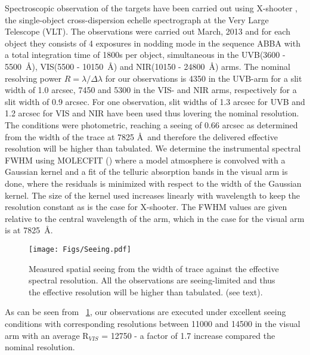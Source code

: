 \documentclass{aa}    %
\newcommand{\figref}[1]{\ref{fig:#1}}
\newcommand{\Fig}[1]{\figurename~\figref{#1}}
\newcommand{\fig}[1]{\Fig{#1}}
\newcommand{\figlabel}[1]{\label{fig:#1}}
\begin{document}
Spectroscopic observation of the targets have been carried out using X-shooter \citep{Vernet2011}, the single-object cross-dispersion echelle spectrograph at the Very Large Telescope (VLT). The observations were carried out March, 2013 and for each object they consists of 4 exposures in nodding mode in the sequence ABBA with a total integration time of 1800s per object, simultaneous in the UVB(3600 - 5500~\AA), VIS(5500 - 10150~\AA)  and NIR(10150 - 24800~\AA) arms. The nominal resolving power $R = \lambda / \Delta \lambda$ for our observations is 4350 in the UVB-arm for a slit width of 1.0 arcsec, 7450 and 5300 in the VIS- and NIR arms, respectively for a slit width of 0.9 arcsec. For one observation, slit widths of 1.3 arcsec for UVB and 1.2 arcsec for VIS and NIR have been used thus lovering the nominal resolution. The conditions were photometric, reaching a seeing of 0.66 arcsec as determined from the width of the trace at 7825 \AA~and therefore the delivered effective resolution will be higher than tabulated. We determine the instrumental spectral FWHM using MOLECFIT (\cite{Smette2015, Kausch2015}) where a model atmosphere is convolved with a Gaussian kernel and a fit of the telluric absorption bands in the visual arm is done, where the residuals is minimized with respect to the width of the Gaussian kernel. The size of the kernel used increases linearly with wavelength to keep the resolution constant as is the case for X-shooter. The FWHM values are given relative to the central wavelength of the arm, which in the case for the visual arm is at 7825~\AA. 


\begin{figure}[t!]
  \centering
  \texttt{[image: Figs/Seeing.pdf]}
  \caption[]{Measured spatial seeing from the width of trace against the effective spectral resolution. All the observations are seeing-limited and thus the effective resolution will be higher than tabulated. (see text).}
\figlabel{seeing}
\end{figure}



As can be seen from \fig{seeing}, our observations are executed under excellent seeing conditions with corresponding resolutions between 11000 and 14500 in the visual arm with an average R$_{VIS}$ = 12750 - a factor of 1.7 increase compared the nominal resolution. 
\end{document}
